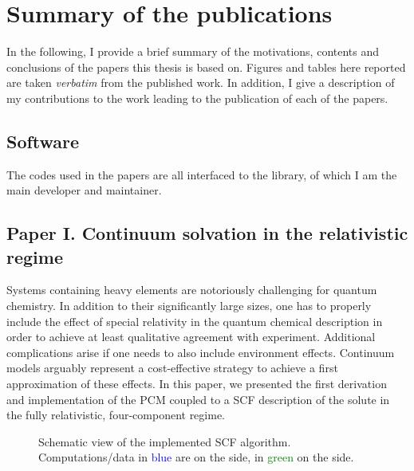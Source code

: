 \chapter{Summary of the publications}\label{ch:publications-summary}

In the following, I provide a brief summary of the motivations, contents and
conclusions of the papers this thesis is based on.
Figures and tables here reported are taken \emph{verbatim} from the published work.
In addition, I give a description of my contributions to the work leading to
the publication of each of the papers.

\section*{Software}

The codes used in the papers are all interfaced to the \pcmsolver library,
of which I am the main developer and maintainer.

\section*{Paper I. Continuum solvation in the relativistic regime}

Systems containing heavy elements are notoriously challenging for quantum chemistry.
In addition to their significantly large sizes, one has to properly include the
effect of special relativity in the quantum chemical description in order to
achieve at least qualitative agreement with experiment.
Additional complications arise if one needs to also include environment effects.
Continuum models arguably represent a cost-effective strategy to achieve a first
approximation of these effects.
In this paper, we presented the first derivation and implementation of the \acs{PCM}
coupled to a \acs{SCF} description of the solute in the fully relativistic, four-component
regime.

\begin{figure}[!htb]
\centering
\scalebox{0.8}{}
\caption{
  Schematic view of the implemented SCF algorithm. Computations/data in
  \textcolor{Blue}{blue} are on the \pcmsolver side, in
  \textcolor{Green}{green} on the \DIRAC side.
  }
\label{fig:algorithm}
\end{figure}

